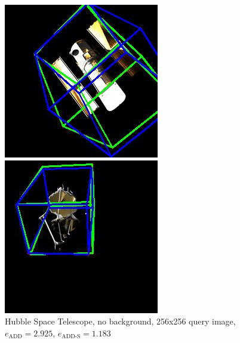 \begin{figure}[h]
    \centering
    \begin{minipage}{0.45\linewidth}
        \centering
        \includegraphics[width=\linewidth]{data/fig3.jpg} %
        \caption{Hubble Space Telescope, no background, 256x256 query image, $e_\mathrm{ADD}=2.925$, $e_{\mathrm{ADD}\text{-}\mathrm{S}}=1.183$ }
        \label{fig:image1}
    \end{minipage}\hfill
    \begin{minipage}{0.45\linewidth}
        \centering
        \includegraphics[width=\linewidth]{data/fig4.jpg} %

\end{minipage}
\end{figure}
